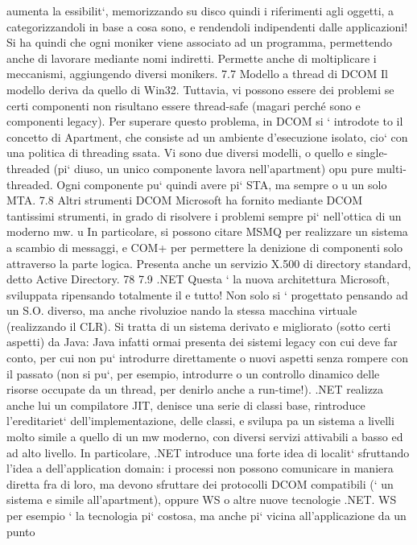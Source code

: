 \documentclass[a4paper,12pt]{article}
\begin{document}
aumenta la essibilit`, memorizzando su disco quindi i riferimenti agli oggetti,
a
categorizzandoli in base a cosa sono, e rendendoli indipendenti dalle applicazioni!
Si ha quindi che ogni moniker viene associato ad un programma, permettendo
anche di lavorare mediante nomi indiretti. Permette anche di moltiplicare i
meccanismi, aggiungendo diversi monikers.
7.7
Modello a thread di DCOM
Il modello deriva da quello di Win32. Tuttavia, vi possono essere dei problemi se certi componenti non risultano essere
thread-safe (magari perché sono
e
componenti legacy). Per superare questo problema, in DCOM si ` introdote
to il concetto di Apartment, che consiste ad un ambiente d'esecuzione isolato,
cio` con una politica di threading ssata. Vi sono due diversi modelli, o quello
e
single-threaded (pi` diuso, un unico componente lavora nell'apartment) opu
pure multi-threaded. Ogni componente pu` quindi avere pi` STA, ma sempre
o
u
un solo MTA.
7.8
Altri strumenti DCOM
Microsoft ha fornito mediante DCOM tantissimi strumenti, in grado di risolvere
i problemi sempre pi` nell'ottica di un moderno mw.
u
In particolare, si possono citare MSMQ per realizzare un sistema a scambio di
messaggi, e COM+ per permettere la denizione di componenti solo attraverso
la parte logica. Presenta anche un servizio X.500 di directory standard, detto
Active Directory.
78
7.9
.NET
Questa ` la nuova architettura Microsoft, sviluppata ripensando totalmente il
e
tutto! Non solo si ` progettato pensando ad un S.O. diverso, ma anche rivoluzioe
nando la stessa macchina virtuale (realizzando il CLR). Si tratta di un sistema
derivato e migliorato (sotto certi aspetti) da Java: Java infatti ormai presenta
dei sistemi legacy con cui deve far conto, per cui non pu` introdurre direttamente
o
nuovi aspetti senza rompere con il passato (non si pu`, per esempio, introdurre
o
un controllo dinamico delle risorse occupate da un thread, per denirlo anche a
run-time!). .NET realizza anche lui un compilatore JIT, denisce una serie di
classi base, rintroduce l'ereditariet` dell'implementazione, delle classi, e svilupa
pa un sistema a livelli molto simile a quello di un mw moderno, con diversi
servizi attivabili a basso ed ad alto livello.
In particolare, .NET introduce una forte idea di localit` sfruttando l'idea
a
dell'application domain: i processi non possono comunicare in maniera diretta
fra di loro, ma devono sfruttare dei protocolli DCOM compatibili (` un sistema
e
simile all'apartment), oppure WS o altre nuove tecnologie .NET. WS per esempio ` la tecnologia pi` costosa, ma anche pi`
vicina all'applicazione da un punto
\end{document}
